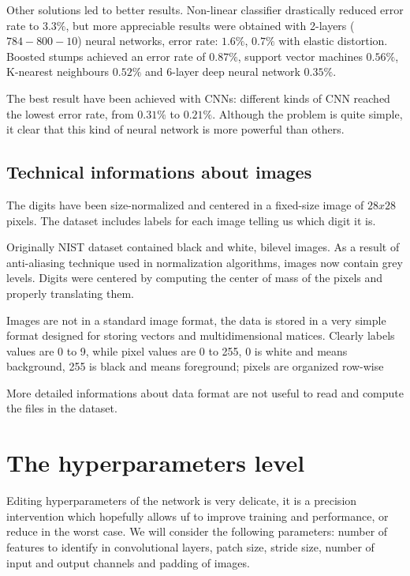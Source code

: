 Other solutions led to better results. Non-linear classifier drastically reduced error rate to $3.3 \%$, but more appreciable results were obtained with 2-layers ($784-800-10$) neural networks, error rate: $1.6 \%$, $0.7 \%$ with elastic distortion. Boosted stumps achieved an error rate of $0.87 \%$, support vector machines $0.56 \%$, K-nearest neighbours $0.52 \%$ and 6-layer deep neural network $0.35 \%$.

The best result have been achieved with \acsp{CNN}: different kinds of \acs{CNN} reached the lowest error rate, from $0.31 \%$ to $0.21 \%$. Although the problem is quite simple, it clear that this kind of neural network is more powerful than others.

\subsection{Technical informations about images}

The digits have been size-normalized and centered in a fixed-size image of $28x28$ pixels. The dataset includes labels for each image telling us which digit it is.

Originally NIST dataset contained black and white, bilevel images. As a result of anti-aliasing technique used in normalization algorithms, images now contain grey levels. Digits were centered by computing the center of mass of the pixels and properly translating them.

Images are not in a standard image format, the data is stored in a very simple format designed for storing vectors and multidimensional matices. Clearly labels values are 0 to 9, while pixel values are 0 to 255, 0 is white and means background, 255 is black and means foreground; pixels are organized row-wise

More detailed informations about data format are not useful to read and compute the files in the dataset.

\section{The hyperparameters level}

Editing hyperparameters of the network is very delicate, it is a precision intervention which hopefully allows uf to improve training and performance, or reduce in the worst case. We will consider the following parameters: number of features to identify in convolutional layers, patch size, stride size, number of input and output channels and padding of images.

